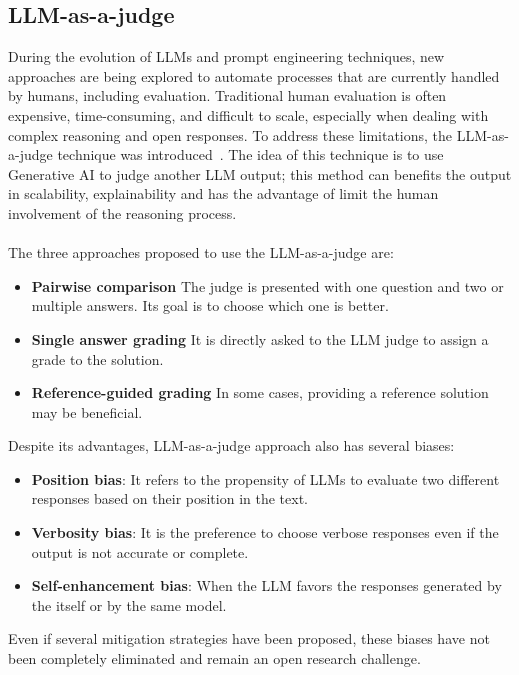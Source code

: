 \documentclass[12pt,a4paper,openright,twoside]{book}
\begin{document}
\subsection{LLM-as-a-judge}
During the evolution of \acp{LLM} and prompt engineering techniques, new approaches are being explored to automate processes that are currently handled by humans, including evaluation.
Traditional human evaluation is often expensive, time-consuming, and difficult to scale, especially when dealing with complex reasoning and open responses.
To address these limitations, the LLM-as-a-judge technique was introduced~\cite{Zheng2023llmasajudge}.
The idea of this technique is to use Generative AI to judge another \ac{LLM} output; this method can benefits the output in scalability, explainability and has the advantage of limit the human involvement of the reasoning process. 
\\\\
The three approaches proposed to use the LLM-as-a-judge are:
\begin{itemize}
    \item \textbf{Pairwise comparison} The judge is presented with one question and two or multiple answers. Its goal is to choose which one is better.
    \item \textbf{Single answer grading} It is directly asked to the \ac{LLM} judge to assign a grade to the solution.
    \item \textbf{Reference-guided grading} In some cases, providing a reference solution may be beneficial.
\end{itemize}

Despite its advantages, LLM-as-a-judge approach also has several biases:
\begin{itemize}
    \item \textbf{Position bias}: It refers to the propensity of \acp{LLM} to evaluate two different responses based on their position in the text. 
    \item \textbf{Verbosity bias}: It is the preference to choose verbose responses even if the output is not accurate or complete.     
    \item \textbf{Self-enhancement bias}: When the \ac{LLM} favors the responses generated by the itself or by the same model.
\end{itemize}
Even if several mitigation strategies have been proposed, these biases have not been completely eliminated and remain an open research challenge.
\end{document}
